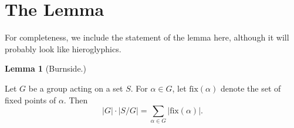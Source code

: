 \documentclass[11pt]{scrartcl}
\begin{document}
\section{The Lemma}

For completeness, we include the statement of the lemma here, although it will probably look like hieroglyphics.

\begin{tcolorbox}[colback=orange!5!white,colframe=orange!75!black]
  \color{orange} \textbf{Lemma 1} (Burnside.)\color{black}
  \vspace{0.1cm}
  
  Let $G$ be a group acting on a set $S$. For $\alpha \in G$, let $\text{fix}(\alpha)$ denote the set of fixed points of $\alpha$. Then\[\lvert G \rvert \cdot \lvert S/G \rvert = \sum_{\alpha \in G} \lvert \text{fix}(\alpha) \rvert .\]

  
\end{tcolorbox}
\end{document}
